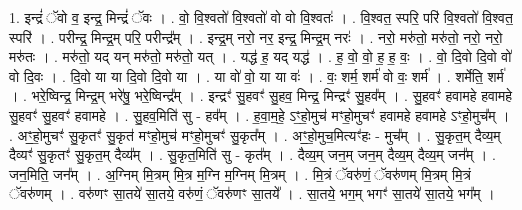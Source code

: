 \documentclass[17pt]{extarticle}
\begin{document}
1. इन्द्रं॑ ॅवो व॒ इन्द्र॒ मिन्द्रं॑ ॅवः । . वो॒ वि॒श्वतो॑ वि॒श्वतो॑ वो वो वि॒श्वतः॑ । . वि॒श्वत॒ स्परि॒ परि॑ वि॒श्वतो॑ वि॒श्वत॒ स्परि॑ । . परीन्द्र॒ मिन्द्र॒म् परि॒ परीन्द्र᳚म् । . इन्द्र॒म् नरो॒ नर॒ इन्द्र॒ मिन्द्र॒म् नरः॑ । . नरो॒ मरु॑तो॒ मरु॑तो॒ नरो॒ नरो॒ मरु॑तः । . मरु॑तो॒ यद् यन् मरु॑तो॒ मरु॑तो॒ यत् । . यद्ध॑ ह॒ यद् यद्ध॑ । . ह॒ वो॒ वो॒ ह॒ ह॒ वः॒ । . वो॒ दि॒वो दि॒वो वो॑ वो दि॒वः । . दि॒वो या या दि॒वो दि॒वो या । . या वो॑ वो॒ या या वः॑ । . वः॒ शर्म॒ शर्म॑ वो वः॒ शर्म॑ । . शर्मेति॒ शर्म॑ । . भरे॒ष्विन्द्र॒ मिन्द्र॒म् भरे॑षु॒ भरे॒ष्विन्द्र᳚म् । . इन्द्रꣳ॑ सु॒हवꣳ॑ सु॒हव॒ मिन्द्र॒ मिन्द्रꣳ॑ सु॒हव᳚म् । . सु॒हवꣳ॑ हवामहे हवामहे सु॒हवꣳ॑ सु॒हवꣳ॑ हवामहे । . सु॒हव॒मिति॑ सु - हव᳚म् । . ह॒वा॒म॒हे॒ ऽꣳ॒हो॒मुच॑ मꣳहो॒मुचꣳ॑ हवामहे हवामहे ऽꣳहो॒मुच᳚म् । . अꣳ॒॒हो॒मुचꣳ॑ सु॒कृतꣳ॑ सु॒कृत॑ मꣳहो॒मुच॑ मꣳहो॒मुचꣳ॑ सु॒कृत᳚म् । . अꣳ॒॒हो॒मुच॒मित्यꣳ॑हः - मुच᳚म् । . सु॒कृत॒म् दैव्य॒म् दैव्यꣳ॑ सु॒कृतꣳ॑ सु॒कृत॒म् दैव्य᳚म् । . सु॒कृत॒मिति॑ सु - कृत᳚म् । . दैव्य॒म् जन॒म् जन॒म् दैव्य॒म् दैव्य॒म् जन᳚म् । . जन॒मिति॒ जन᳚म् । . अ॒ग्निम् मि॒त्रम् मि॒त्र म॒ग्नि म॒ग्निम् मि॒त्रम् । . मि॒त्रं ॅवरु॑णं॒ ॅवरु॑णम् मि॒त्रम् मि॒त्रं ॅवरु॑णम् । . वरु॑णꣳ सा॒तये॑ सा॒तये॒ वरु॑णं॒ ॅवरु॑णꣳ सा॒तये᳚ । . सा॒तये॒ भग॒म् भगꣳ॑ सा॒तये॑ सा॒तये॒ भग᳚म् । \newline
\end{document}
